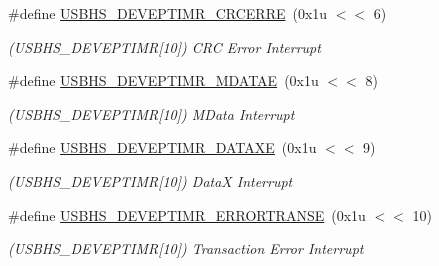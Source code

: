 \begin{DoxyCompactItemize}
\mbox{\label{group__SAME70__USBHS_gaf11b63faa3c81681651d1c618d4a8896}} 
\#define \mbox{\hyperlink{group__SAME70__USBHS_gaf11b63faa3c81681651d1c618d4a8896}{U\+S\+B\+H\+S\+\_\+\+D\+E\+V\+E\+P\+T\+I\+M\+R\+\_\+\+C\+R\+C\+E\+R\+RE}}~(0x1u $<$$<$ 6)
\begin{DoxyCompactList}\small\item\em (U\+S\+B\+H\+S\+\_\+\+D\+E\+V\+E\+P\+T\+I\+MR\mbox{[}10\mbox{]}) C\+RC Error Interrupt \end{DoxyCompactList}\item 
\mbox{\label{group__SAME70__USBHS_ga8dbb85f27a0c6b5f6ddf2d3f7aee3c10}} 
\#define \mbox{\hyperlink{group__SAME70__USBHS_ga8dbb85f27a0c6b5f6ddf2d3f7aee3c10}{U\+S\+B\+H\+S\+\_\+\+D\+E\+V\+E\+P\+T\+I\+M\+R\+\_\+\+M\+D\+A\+T\+AE}}~(0x1u $<$$<$ 8)
\begin{DoxyCompactList}\small\item\em (U\+S\+B\+H\+S\+\_\+\+D\+E\+V\+E\+P\+T\+I\+MR\mbox{[}10\mbox{]}) M\+Data Interrupt \end{DoxyCompactList}\item 
\mbox{\label{group__SAME70__USBHS_gaf3e4e1efe7661d24c3cb60e370824a04}} 
\#define \mbox{\hyperlink{group__SAME70__USBHS_gaf3e4e1efe7661d24c3cb60e370824a04}{U\+S\+B\+H\+S\+\_\+\+D\+E\+V\+E\+P\+T\+I\+M\+R\+\_\+\+D\+A\+T\+A\+XE}}~(0x1u $<$$<$ 9)
\begin{DoxyCompactList}\small\item\em (U\+S\+B\+H\+S\+\_\+\+D\+E\+V\+E\+P\+T\+I\+MR\mbox{[}10\mbox{]}) DataX Interrupt \end{DoxyCompactList}\item 
\mbox{\label{group__SAME70__USBHS_ga39d2bc9137a99d759e889e72b20d5784}} 
\#define \mbox{\hyperlink{group__SAME70__USBHS_ga39d2bc9137a99d759e889e72b20d5784}{U\+S\+B\+H\+S\+\_\+\+D\+E\+V\+E\+P\+T\+I\+M\+R\+\_\+\+E\+R\+R\+O\+R\+T\+R\+A\+N\+SE}}~(0x1u $<$$<$ 10)
\begin{DoxyCompactList}\small\item\em (U\+S\+B\+H\+S\+\_\+\+D\+E\+V\+E\+P\+T\+I\+MR\mbox{[}10\mbox{]}) Transaction Error Interrupt \end{DoxyCompactList}\item 
\mbox{\label{group__SAME70__USBHS_gadaf4a6b6fc4cd4f3ccb9f038c0dd961c}} 

\end{DoxyCompactItemize}
